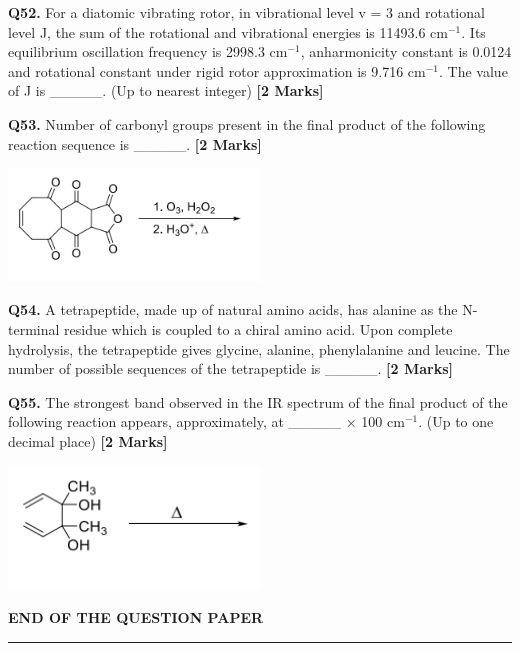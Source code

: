\documentclass[11pt]{article}
\newcommand{\questionb}[2]{
    \noindent\textbf{Q#2.} #1 \hfill \textbf{[2 Marks]}
}
\begin{document}
\questionb{For a diatomic vibrating rotor, in vibrational level v = 3 and rotational level J, the sum of the rotational and vibrational energies is 11493.6 cm$^{-1}$. Its equilibrium oscillation frequency is 2998.3 cm$^{-1}$, anharmonicity constant is 0.0124 and rotational constant under rigid rotor approximation is 9.716 cm$^{-1}$. The value of J is \_\_\_\_\_. (Up to nearest integer)}{52}
\vspace{0.5cm}

\questionb{Number of carbonyl groups present in the final product of the following reaction sequence is \_\_\_\_\_.}{53}
\begin{center}
\includegraphics[width=0.5\textwidth]{figures/53.png}
\end{center}
\vspace{0.5cm}

\questionb{A tetrapeptide, made up of natural amino acids, has alanine as the N-terminal residue which is coupled to a chiral amino acid. Upon complete hydrolysis, the tetrapeptide gives glycine, alanine, phenylalanine and leucine. The number of possible sequences of the tetrapeptide is \_\_\_\_\_.}{54}
\vspace{0.5cm}

\questionb{The strongest band observed in the IR spectrum of the final product of the following reaction appears, approximately, at \_\_\_\_\_ × 100 cm$^{-1}$. (Up to one decimal place)}{55}
\begin{center}
\includegraphics[width=0.5\textwidth]{figures/55.png}
\end{center}
\vspace{0.5cm}

\begin{center}
\textbf{END OF THE QUESTION PAPER}
\rule{\textwidth}{0.5pt} 
\end{center}
\end{document}
